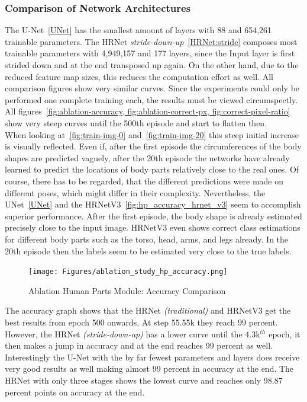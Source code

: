 \subsubsection{Comparison of Network Architectures}
%
The U-Net~\ref{UNet} has the smallest amount of layers with 88 and 654,261 trainable parameters.
The HRNet \textit{stride-down-up}~\ref{HRNet:stride} composes most trainable parameters with 4,949,157 and 177 layers, since the Input
layer is first strided down and at the end transposed up again.
On the other hand, due to the reduced feature map sizes, this reduces the computation effort as well.
All comparison figures show very similar curves.
Since the experiments could only be performed one complete training each, the results must be viewed circumspectly.
All figures~\ref{fig:ablation-accuracy, fig:ablation-correct-px, fig:correct-pixel-ratio} show very steep curves until
the 500th episode and start to flatten then.\\
When looking at~\ref{fig:train-img-0} and~\ref{fig:train-img-20} this steep initial increase is visually reflected.
Even if, after the first episode the circumferences of the body shapes are predicted vaguely, after the 20th episode the
networks have already learned to predict the locations of body parts relatively close to the real ones.
Of course, there has to be regarded, that the different predictions were made on different poses, which might differ in
their complexity.
Nevertheless, the UNet~\ref{UNet} and the HRNetV3~\ref{fig:hp_accuracy_hrnet_v3} seem to accomplish superior performance.
After the first episode, the body shape is already estimated precisely close to the input image.
HRNetV3 even shows correct class estimations for different body parts such as the torso, head, arms, and legs already.
In the 20th episode then the labels seem to be estimated very close to the true labels.

\begin{figure}[H]
    \centering
    \texttt{[image: Figures/ablation\_study\_hp\_accuracy.png]}
    \decoRule
    \caption[Ablation Human Parts Module: Accuracy]{Ablation Human Parts Module: Accuracy Comparison}
    \label{fig:ablation-accuracy}
\end{figure}

The accuracy graph shows that the HRNet \textit{(traditional)} and HRNetV3 get the best results from epoch 500 onwards.
At step 55.55k they reach 99 percent.
However, the HRNet \textit{(stride-down-up)} has a lower curve until the 4.3k$^{th}$ epoch, it then makes a jump in accuracy
and at the end reaches 99 percent as well.
Interestingly the U-Net with the by far fewest parameters and layers does receive very good results as well making almost
99 percent in accuracy at the end.
The HRNet with only three stages shows the lowest curve and reaches only 98.87 percent points on accuracy at the end.

